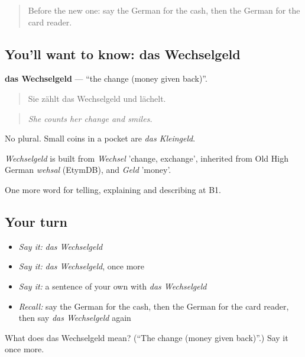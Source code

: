 \label{lesson:GE-C449-wechselgeld}



\begin{quote}
Before the new one: say the German for the cash, then the German for the card reader.
\end{quote}

\subsection*{You'll want to know: das Wechselgeld}
\textbf{das Wechselgeld} — \textquotedblleft{}the change (money given back)\textquotedblright{}.

\begin{quote}
Sie zählt das Wechselgeld und lächelt.
\end{quote}

\begin{quote}
\emph{She counts her change and smiles.}
\end{quote}

No plural. Small coins in a pocket are \emph{das Kleingeld}.

\begin{cousinweb}
\emph{Wechselgeld} is built from \emph{Wechsel} 'change, exchange', inherited from Old High German \emph{wehsal} (EtymDB), and \emph{Geld} 'money'.
\end{cousinweb}

\begin{grammarlens}[title={What you've built}]
One more word for telling, explaining and describing at B1.
\end{grammarlens}

\subsection*{Your turn}
\begin{itemize}
\raggedright
  \item \emph{Say it:} \emph{das Wechselgeld}
  \item \emph{Say it:} \emph{das Wechselgeld}, once more
  \item \emph{Say it:} a sentence of your own with \emph{das Wechselgeld}
  \item \emph{Recall:} say the German for the cash, then the German for the card reader, then say \emph{das Wechselgeld} again
\end{itemize}

\begin{tcolorbox}[breakable,colback=teal!4,colframe=teal!35!black,title={Before you move on}]
What does das Wechselgeld mean? (\textquotedblleft{}The change (money given back)\textquotedblright{}.) Say it once more.
\end{tcolorbox}
